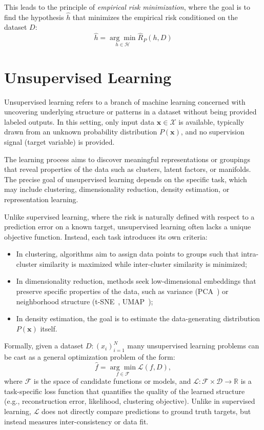 This leads to the principle of \textit{empirical risk minimization}, where the
goal is to find the hypothesis $\hat{h}$ that minimizes the empirical risk
conditioned on the dataset $D$:
\begin{equation}
    \hat{h} = \underset{h \in \mathcal{H}}{\arg\min} \hat{R}_P(h, D)
\end{equation}

\section{Unsupervised Learning}\label{sec:unsupervised_learning}
Unsupervised learning refers to a branch of machine learning concerned with
uncovering underlying structure or patterns in a dataset without being provided
labeled outputs. In this setting, only input data $\mathbf{x} \in \mathcal{X}$
is available, typically drawn from an unknown probability distribution
$P(\mathbf{x})$, and no supervision signal (target variable) is provided.

The learning process aims to discover meaningful representations or groupings
that reveal properties of the data such as clusters, latent factors, or
manifolds. The precise goal of unsupervised learning depends on the specific
task, which may include clustering, dimensionality reduction, density
estimation, or representation learning.

Unlike supervised learning, where the risk is naturally defined with respect to
a prediction error on a known target, unsupervised learning often lacks a
unique objective function. Instead, each task introduces its own criteria:
\begin{itemize}
    \item In clustering, algorithms aim to assign data points to groups such that
          intra-cluster similarity is maximized while inter-cluster similarity is
          minimized;
    \item In dimensionality reduction, methods seek low-dimensional embeddings that
          preserve specific properties of the data, such as variance (PCA~\cite{pca}) or
          neighborhood structure (t-SNE~\cite{tsne}, UMAP~\cite{umap});
    \item In density estimation, the goal is to estimate the data-generating distribution
          $P(\mathbf{x})$ itself.
\end{itemize}

Formally, given a dataset $D: (x_i)_{i=1}^N$ many unsupervised learning
problems can be cast as a general optimization problem of the form:
\begin{equation}
    \hat{f} = \underset{f \in \mathcal{F}}{\arg\min} \mathcal{L}(f, D),
\end{equation}
where $\mathcal{F}$ is the space of candidate functions or models, and
$\mathcal{L}: \mathcal{F} \times \mathcal{D} \rightarrow \mathbb{R}$ is a task-specific loss function that quantifies the quality of
the learned structure (e.g., reconstruction error, likelihood, clustering
objective). Unlike in supervised learning, $\mathcal{L}$ does not directly
compare predictions to ground truth targets, but instead measures
inter-consistency or data fit.

